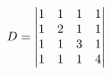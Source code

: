 \documentclass[preview]{standalone}
\begin{document}
\begin{align*}
\special{dvisvgm:raw <g id='unique000'>}D=\begin{vmatrix}1&1&1&1\\1&2&1&1\\1&1&3&1\\1&1&1&4\end{vmatrix}\special{dvisvgm:raw </g>}
\end{align*}
\end{document}
